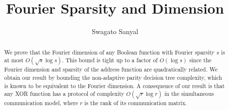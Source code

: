 \documentclass{toc}
\begin{document}
\begin{frontmatter}[classification=text]
  
%
%

%
%

 \title{Fourier Sparsity and Dimension}
%

%
%
%
%
%
%
%
%
%
%
%
%


%
%
%
%

%

\author[sanyal]{Swagato Sanyal}

%
%
%
%

%
%
%
%
%
%
\begin{abstract}
We prove that the Fourier dimension of any Boolean function with
  Fourier sparsity $s$ is at most $O\left(\sqrt{s} \log s\right)$. This
  bound is tight up to a factor of $O(\log s)$ since the Fourier dimension and sparsity of
  the address function are quadratically related. We obtain our result by bounding the non-adaptive parity decision
tree complexity, which is known to be equivalent to the Fourier
dimension. A consequence of our result is that any
XOR function has a protocol of complexity $O(\sqrt{r} \log r)$ in the simultaneous communication model,
where $r$ is the rank of its communication matrix.
\end{abstract}

%

\end{frontmatter}

%
%
%
\end{document}
